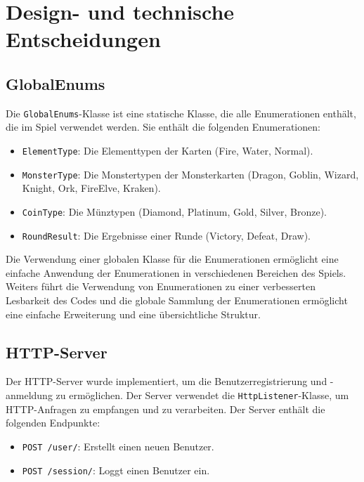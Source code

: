 \documentclass[a4paper, 12pt]{article}
\begin{document}
\section{Design- und technische Entscheidungen}
\subsection{GlobalEnums}
Die \texttt{GlobalEnums}-Klasse ist eine statische Klasse, die alle Enumerationen enthält, die im Spiel verwendet werden. Sie enthält die folgenden Enumerationen:
\begin{itemize}
    \item \texttt{ElementType}: Die Elementtypen der Karten (Fire, Water, Normal).
    \item \texttt{MonsterType}: Die Monstertypen der Monsterkarten (Dragon, Goblin, Wizard, Knight, Ork, FireElve, Kraken).
    \item \texttt{CoinType}: Die Münztypen (Diamond, Platinum, Gold, Silver, Bronze).
    \item \texttt{RoundResult}: Die Ergebnisse einer Runde (Victory, Defeat, Draw).
\end{itemize}
Die Verwendung einer globalen Klasse für die Enumerationen ermöglicht eine einfache Anwendung der Enumerationen in verschiedenen Bereichen des Spiels.
Weiters führt die Verwendung von Enumerationen zu einer verbesserten Lesbarkeit des Codes und die globale Sammlung der Enumerationen ermöglicht eine einfache Erweiterung und eine übersichtliche Struktur.

\subsection{HTTP-Server}
Der HTTP-Server wurde implementiert, um die Benutzerregistrierung und -anmeldung zu ermöglichen. Der Server verwendet die \texttt{HttpListener}-Klasse, um HTTP-Anfragen zu empfangen und zu verarbeiten. Der Server enthält die folgenden Endpunkte:
\begin{itemize}
    \item \texttt{POST /user/}: Erstellt einen neuen Benutzer.
    \item \texttt{POST /session/}: Loggt einen Benutzer ein.
\end{itemize}
\end{document}

